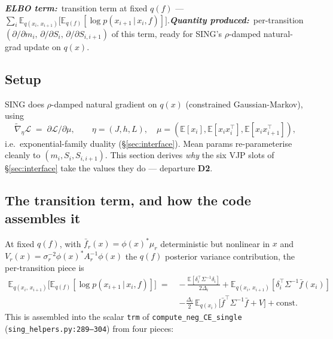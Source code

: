 \documentclass[11pt]{article}
\newcommand{\E}{\mathbb{E}}
\newcommand{\Eq}[1][q]{\mathbb{E}_{#1}}
\newcommand{\Eqx}{\mathbb{E}_{q(x_i)}}
\newcommand{\Eqxx}{\mathbb{E}_{q(x_i,\,x_{i+1})}}
\newcommand{\given}{\,|\,}
\newcommand{\code}[1]{\texttt{\small #1}}
\newcommand{\elbobanner}[2]{%
\par\noindent\textbf{\textit{ELBO term:}}\ #1\quad\textbf{\textit{Quantity produced:}}\ #2\par\medskip}
\begin{document}
\elbobanner{transition term at fixed $q(f)$ ---
$\sum_i \Eqxx\bigl[\Eq[q(f)][\log p(x_{i+1}\given x_i, f)]\bigr]$.}{per-transition
$(\partial/\partial m_i,\, \partial/\partial S_i,\, \partial/\partial S_{i,i+1})$
of this term, ready for SING's $\rho$-damped natural-grad update on $q(x)$.}

\subsection*{Setup}

SING does $\rho$-damped natural gradient on $q(x)$ (constrained
Gaussian-Markov), using
\begin{equation}
\widetilde\nabla_\eta \mathcal{L} \;=\; \partial \mathcal{L}/\partial \mu,
\qquad \eta=(J,h,L),\quad
\mu=(\E[x_i], \E[x_ix_i^\top], \E[x_ix_{i+1}^\top]),
\label{eq:natgrad-duality}
\end{equation}
i.e.\ exponential-family duality (\S\ref{sec:interface}). Mean params
re-parameterise cleanly to $(m_i, S_i, S_{i,i+1})$. This section derives
\emph{why} the six VJP slots of \S\ref{sec:interface} take the values they
do --- departure \textbf{D2}.

\subsection*{The transition term, and how the code assembles it}

At fixed $q(f)$, with $\bar f_r(x) = \phi(x)^* \mu_r$ deterministic but
nonlinear in $x$ and $V_r(x) = \sigma_r^{-2}\phi(x)^* A_r^{-1}\phi(x)$
the $q(f)$ posterior variance contribution, the per-transition piece is
\begin{equation}
\begin{aligned}
\Eqxx\!\bigl[\Eq[q(f)][\log p(x_{i+1}\given x_i, f)]\bigr]
\;=\;&
-\,\frac{\E[\delta_i^\top\Sigma^{-1}\delta_i]}{2\Delta_i}
+ \Eqxx[\delta_i^\top\Sigma^{-1}\bar f(x_i)]\\
&- \frac{\Delta_i}{2}\,\Eqx\!\bigl[\bar f^\top\Sigma^{-1}\bar f + V\bigr]
+ \text{const}.
\end{aligned}
\label{eq:transition-frozen}
\end{equation}
This is assembled into the scalar \code{trm} of
\code{compute\_neg\_CE\_single} (\code{sing\_helpers.py:289--304}) from
four pieces:
\end{document}
